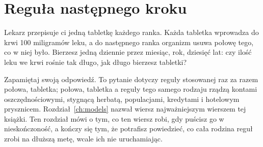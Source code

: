 
\chapter{Reguła następnego kroku}
\label{ch:iteration}

\noindent
Lekarz przepisuje ci jedną tabletkę każdego ranka. Każda tabletka wprowadza
do krwi 100 miligramów leku, a do następnego ranka organizm usuwa połowę
tego, co w niej było. Bierzesz jedną dziennie przez miesiąc, rok, dziesięć
lat: czy ilość leku we krwi rośnie tak długo, jak długo bierzesz tabletki?

Zapamiętaj swoją odpowiedź. To pytanie dotyczy reguły stosowanej raz za
razem \dash{} połowa, tabletka; połowa, tabletka \dash{} a reguły tego
samego rodzaju rządzą kontami oszczędnościowymi, stygnącą herbatą,
populacjami, kredytami i hotelowym prysznicem. Rozdział~\ref{ch:models}
nazwał wiersz  najważniejszym wierszem tej
książki. Ten rozdział mówi o tym, co ten wiersz robi, gdy puścisz go w
nieskończoność, a kończy się tym, że potrafisz powiedzieć, co cała rodzina
reguł zrobi na dłuższą metę, wcale ich nie uruchamiając.

\begin{outcomes}
\end{outcomes}

